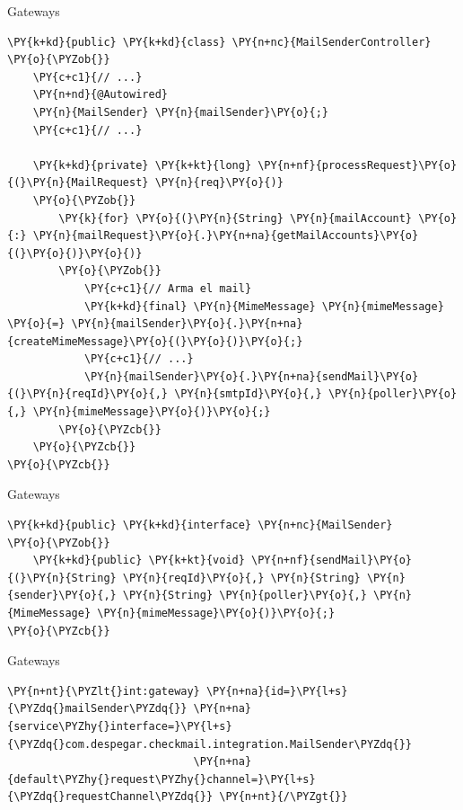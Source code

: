 \documentclass{beamer}
\begin{document}
\begin{frame}[fragile]{Gateways}
\begin{Verbatim}[fontsize=\tiny,commandchars=\\\{\}]
\PY{k+kd}{public} \PY{k+kd}{class} \PY{n+nc}{MailSenderController}
\PY{o}{\PYZob{}}
    \PY{c+c1}{// ...}
    \PY{n+nd}{@Autowired}
    \PY{n}{MailSender} \PY{n}{mailSender}\PY{o}{;}
    \PY{c+c1}{// ...}
    
    \PY{k+kd}{private} \PY{k+kt}{long} \PY{n+nf}{processRequest}\PY{o}{(}\PY{n}{MailRequest} \PY{n}{req}\PY{o}{)}
    \PY{o}{\PYZob{}}
        \PY{k}{for} \PY{o}{(}\PY{n}{String} \PY{n}{mailAccount} \PY{o}{:} \PY{n}{mailRequest}\PY{o}{.}\PY{n+na}{getMailAccounts}\PY{o}{(}\PY{o}{)}\PY{o}{)}
        \PY{o}{\PYZob{}}
            \PY{c+c1}{// Arma el mail}
            \PY{k+kd}{final} \PY{n}{MimeMessage} \PY{n}{mimeMessage} \PY{o}{=} \PY{n}{mailSender}\PY{o}{.}\PY{n+na}{createMimeMessage}\PY{o}{(}\PY{o}{)}\PY{o}{;}
            \PY{c+c1}{// ...}
            \PY{n}{mailSender}\PY{o}{.}\PY{n+na}{sendMail}\PY{o}{(}\PY{n}{reqId}\PY{o}{,} \PY{n}{smtpId}\PY{o}{,} \PY{n}{poller}\PY{o}{,} \PY{n}{mimeMessage}\PY{o}{)}\PY{o}{;}
        \PY{o}{\PYZcb{}}
    \PY{o}{\PYZcb{}}
\PY{o}{\PYZcb{}}
\end{Verbatim}
\end{frame}


\begin{frame}[fragile]{Gateways}
\begin{Verbatim}[fontsize=\tiny,commandchars=\\\{\}]
\PY{k+kd}{public} \PY{k+kd}{interface} \PY{n+nc}{MailSender}
\PY{o}{\PYZob{}}
    \PY{k+kd}{public} \PY{k+kt}{void} \PY{n+nf}{sendMail}\PY{o}{(}\PY{n}{String} \PY{n}{reqId}\PY{o}{,} \PY{n}{String} \PY{n}{sender}\PY{o}{,} \PY{n}{String} \PY{n}{poller}\PY{o}{,} \PY{n}{MimeMessage} \PY{n}{mimeMessage}\PY{o}{)}\PY{o}{;}
\PY{o}{\PYZcb{}}
\end{Verbatim}
\end{frame}


\begin{frame}[fragile]{Gateways}
\begin{Verbatim}[fontsize=\tiny,commandchars=\\\{\}]
\PY{n+nt}{\PYZlt{}int:gateway} \PY{n+na}{id=}\PY{l+s}{\PYZdq{}mailSender\PYZdq{}} \PY{n+na}{service\PYZhy{}interface=}\PY{l+s}{\PYZdq{}com.despegar.checkmail.integration.MailSender\PYZdq{}} 
                             \PY{n+na}{default\PYZhy{}request\PYZhy{}channel=}\PY{l+s}{\PYZdq{}requestChannel\PYZdq{}} \PY{n+nt}{/\PYZgt{}}
\end{Verbatim}
\end{frame}
\end{document}
